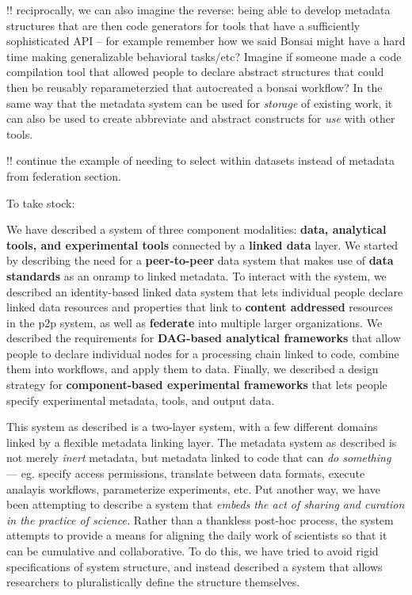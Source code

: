 \documentclass[10pt]{article}
\begin{document}
\begin{multicols}{2}
!! reciprocally, we can also imagine the reverse: being able to develop
metadata structures that are then code generators for tools that have a
sufficiently sophisticated API -- for example remember how we said
Bonsai might have a hard time making generalizable behavioral tasks/etc?
Imagine if someone made a code compilation tool that allowed people to
declare abstract structures that could then be reusably reparameterzied
that autocreated a bonsai workflow? In the same way that the metadata
system can be used for \emph{storage} of existing work, it can also be
used to create abbreviate and abstract constructs for \emph{use} with
other tools.

!! continue the example of needing to select within datasets instead of
metadata from federation section.

To take stock:

We have described a system of three component modalities: \textbf{data,
analytical tools, and experimental tools} connected by a \textbf{linked
data} layer. We started by describing the need for a
\textbf{peer-to-peer} data system that makes use of \textbf{data
standards} as an onramp to linked metadata. To interact with the system,
we described an identity-based linked data system that lets individual
people declare linked data resources and properties that link to
\textbf{content addressed} resources in the p2p system, as well as
\textbf{federate} into multiple larger organizations. We described the
requirements for \textbf{DAG-based analytical frameworks} that allow
people to declare individual nodes for a processing chain linked to
code, combine them into workflows, and apply them to data. Finally, we
described a design strategy for \textbf{component-based experimental
frameworks} that lets people specify experimental metadata, tools, and
output data.

This system as described is a two-layer system, with a few different
domains linked by a flexible metadata linking layer. The metadata system
as described is not merely \emph{inert} metadata, but metadata linked to
code that can \emph{do something} --- eg. specify access permissions,
translate between data formats, execute analayis workflows, parameterize
experiments, etc. Put another way, we have been attempting to describe a
system that \emph{embeds the act of sharing and curation in the practice
of science.} Rather than a thankless post-hoc process, the system
attempts to provide a means for aligning the daily work of scientists so
that it can be cumulative and collaborative. To do this, we have tried
to avoid rigid specifications of system structure, and instead described
a system that allows researchers to pluralistically define the structure
themselves.


\end{multicols}
\end{document}
